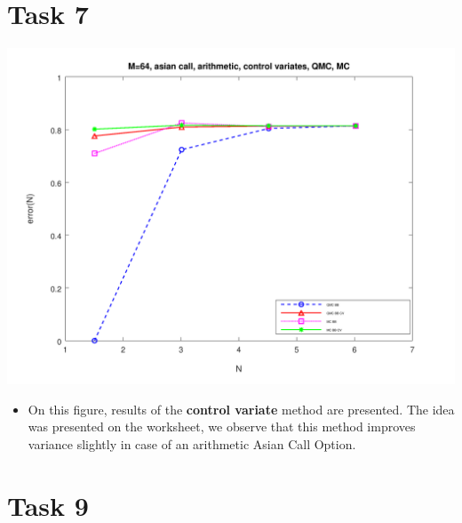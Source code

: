 \documentclass[10pt,a4paper]{article}
\begin{document}
\section*{Task 7}


\begin{center}
	\includegraphics[scale=0.25]{images/task7.png}
\end{center}
\begin{itemize}
    \item{
        On this figure, results of the \textbf{control variate}
        method are presented. The idea was presented on the worksheet, we observe that this method improves variance slightly in case of an arithmetic Asian Call Option. 
    }
\end{itemize}

\section*{Task 9}
\end{document}
